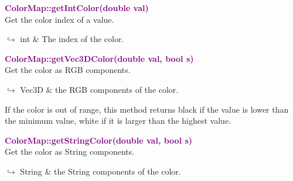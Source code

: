 \textcolor{purple}{\textbf{ColorMap::getIntColor(double val)}}\label{ColorMap::getIntColor(double val)}\\
Get the color index of a value.\vspace*{-0.5em}
\begin{tcolorbox}[grow to left by=-1cm, width=\textwidth-1cm,myArgs,tabularx={l|R}]
$\hookrightarrow$  int & The index of the color.
\end{tcolorbox}

\begin{tcolorbox}[width=\textwidth,myArgs,tabularx={ll|R}]

\end{tcolorbox}


\textcolor{purple}{\textbf{ColorMap::getVec3DColor(double val, bool s)}}\label{ColorMap::getVec3DColor(double val, bool s)}\\
Get the color as RGB components.\vspace*{-0.5em}
\begin{tcolorbox}[grow to left by=-1cm, width=\textwidth-1cm,myArgs,tabularx={l|R}]
$\hookrightarrow$  Vec3D & the RGB components of the color.
\end{tcolorbox}

\begin{tcolorbox}[width=\textwidth,myArgs,tabularx={ll|R}]


\end{tcolorbox}

If the color is out of range, this method returns black if the value is lower than the minimum value, white if it is larger than the highest value.

\textcolor{purple}{\textbf{ColorMap::getStringColor(double val, bool s)}}\label{ColorMap::getStringColor(double val, bool s)}\\
Get the color as String components.\vspace*{-0.5em}
\begin{tcolorbox}[grow to left by=-1cm, width=\textwidth-1cm,myArgs,tabularx={l|R}]
$\hookrightarrow$  String & the String components of the color.
\end{tcolorbox}

